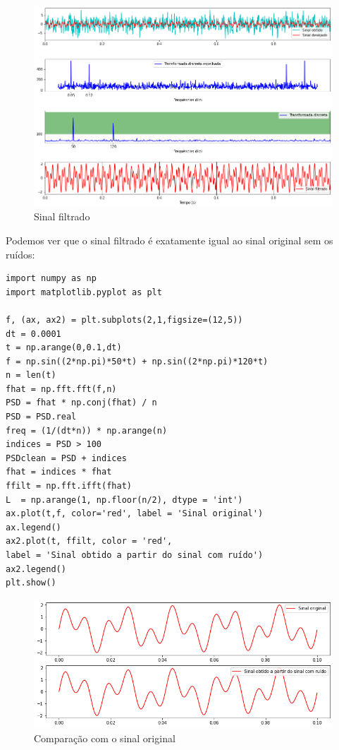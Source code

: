 \begin{figure}[H]
	\centering
	\includegraphics[width=1\textwidth]{./Imagens/Transformada de Fourier/TF4.png} 
	\caption{Sinal filtrado}
	\label{fig:TF4}
\end{figure}

Podemos ver que o sinal filtrado é exatamente igual ao sinal original sem os ruídos:

\begin{verbatim}
import numpy as np
import matplotlib.pyplot as plt

f, (ax, ax2) = plt.subplots(2,1,figsize=(12,5))
dt = 0.0001
t = np.arange(0,0.1,dt)
f = np.sin((2*np.pi)*50*t) + np.sin((2*np.pi)*120*t)
n = len(t)
fhat = np.fft.fft(f,n)
PSD = fhat * np.conj(fhat) / n
PSD = PSD.real
freq = (1/(dt*n)) * np.arange(n)
indices = PSD > 100
PSDclean = PSD + indices
fhat = indices * fhat
ffilt = np.fft.ifft(fhat)
L  = np.arange(1, np.floor(n/2), dtype = 'int')
ax.plot(t,f, color='red', label = 'Sinal original')
ax.legend()
ax2.plot(t, ffilt, color = 'red', 
label = 'Sinal obtido a partir do sinal com ruído')
ax2.legend()
plt.show()
\end{verbatim}

\begin{figure}[H]
	\centering
	\includegraphics[width=1\textwidth]{./Imagens/Transformada de Fourier/TF5.png} 
	\caption{Comparação com o sinal original}
	\label{fig:TF5}
\end{figure}

